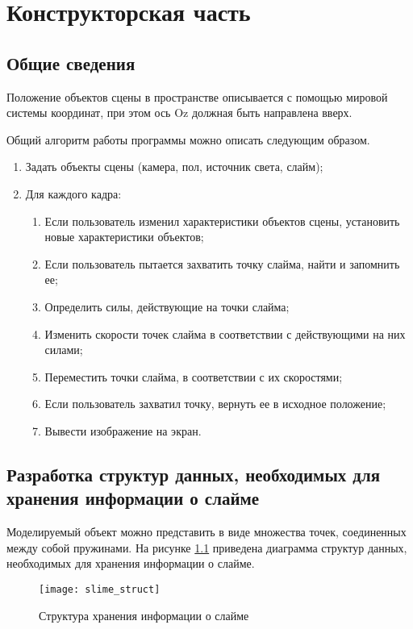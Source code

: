 \chapter{Конструкторская часть}

\section{Общие сведения}

Положение объектов сцены в пространстве описывается с помощью
мировой системы координат, при этом ось Oz должная быть направлена вверх.

Общий алгоритм работы программы можно описать следующим образом.

\begin{enumerate}
	\item Задать объекты сцены (камера, пол, источник света, слайм);
	\item Для каждого кадра:
	\begin{enumerate}
		\item Если пользователь изменил характеристики объектов сцены, установить новые характеристики объектов;
		\item Если пользователь пытается захватить точку слайма, найти и запомнить ее;
		\item Определить силы, действующие на точки слайма;
		\item Изменить скорости точек слайма в соответствии с действующими на них силами;
		\item Переместить точки слайма, в соответствии с их скоростями;
		\item Если пользователь захватил точку, вернуть ее в исходное положение;
		\item Вывести изображение на экран.
	\end{enumerate}
\end{enumerate}

\section{Разработка структур данных, необходимых для хранения информации о слайме}

Моделируемый объект можно представить в виде множества точек, соединенных между собой пружинами. На рисунке \ref{slime_struct} приведена диаграмма структур данных, необходимых для хранения информации о слайме.

\begin{figure}[H]
	\centering
	\texttt{[image: slime\_struct]}
	\caption{Структура хранения информации о слайме}
	\label{slime_struct}
\end{figure}


